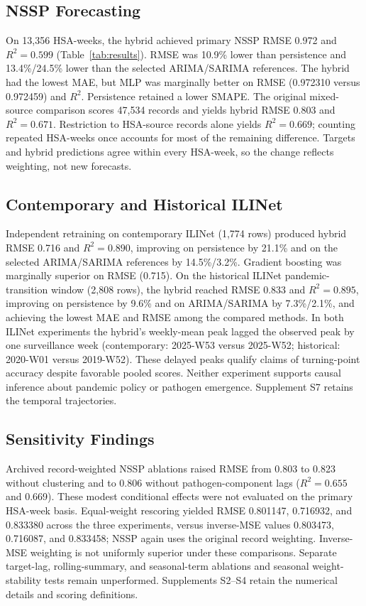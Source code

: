 \documentclass[conference,a4paper]{IEEEtran}
\begin{document}
\subsection{NSSP Forecasting}
On 13,356 HSA-weeks, the hybrid achieved primary NSSP RMSE 0.972 and $R^2=0.599$ (Table~\ref{tab:results}). RMSE was 10.9\% lower than persistence and 13.4\%/24.5\% lower than the selected ARIMA/SARIMA references. The hybrid had the lowest MAE, but MLP was marginally better on RMSE (0.972310 versus 0.972459) and $R^2$. Persistence retained a lower SMAPE. The original mixed-source comparison scores 47,534 records and yields hybrid RMSE 0.803 and $R^2=0.671$. Restriction to HSA-source records alone yields $R^2=0.669$; counting repeated HSA-weeks once accounts for most of the remaining difference. Targets and hybrid predictions agree within every HSA-week, so the change reflects weighting, not new forecasts.

\subsection{Contemporary and Historical ILINet}
Independent retraining on contemporary ILINet (1,774 rows) produced hybrid RMSE 0.716 and $R^2=0.890$, improving on persistence by 21.1\% and on the selected ARIMA/SARIMA references by 14.5\%/3.2\%. Gradient boosting was marginally superior on RMSE (0.715). On the historical ILINet pandemic-transition window (2,808 rows), the hybrid reached RMSE 0.833 and $R^2=0.895$, improving on persistence by 9.6\% and on ARIMA/SARIMA by 7.3\%/2.1\%, and achieving the lowest MAE and RMSE among the compared methods. In both ILINet experiments the hybrid's weekly-mean peak lagged the observed peak by one surveillance week (contemporary: 2025-W53 versus 2025-W52; historical: 2020-W01 versus 2019-W52). These delayed peaks qualify claims of turning-point accuracy despite favorable pooled scores. Neither experiment supports causal inference about pandemic policy or pathogen emergence. Supplement S7 retains the temporal trajectories.

\subsection{Sensitivity Findings}
Archived record-weighted NSSP ablations raised RMSE from 0.803 to 0.823 without clustering and to 0.806 without pathogen-component lags ($R^2=0.655$ and 0.669). These modest conditional effects were not evaluated on the primary HSA-week basis. Equal-weight rescoring yielded RMSE 0.801147, 0.716932, and 0.833380 across the three experiments, versus inverse-MSE values 0.803473, 0.716087, and 0.833458; NSSP again uses the original record weighting. Inverse-MSE weighting is not uniformly superior under these comparisons. Separate target-lag, rolling-summary, and seasonal-term ablations and seasonal weight-stability tests remain unperformed. Supplements S2--S4 retain the numerical details and scoring definitions.
\end{document}

